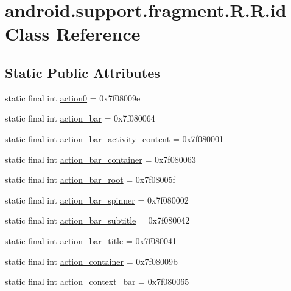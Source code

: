 \hypertarget{classandroid_1_1support_1_1fragment_1_1_r_1_1id}{
\section{android.support.fragment.R.R.id Class Reference}
\label{classandroid_1_1support_1_1fragment_1_1_r_1_1id}
}
\subsection*{Static Public Attributes}
\begin{CompactItemize}
\item 
static final int \hyperlink{classandroid_1_1support_1_1fragment_1_1_r_1_1id_8768c2d6a2ef0f8ac9ca56da079d671c}{action0} = 0x7f08009e
\item 
static final int \hyperlink{classandroid_1_1support_1_1fragment_1_1_r_1_1id_61432839d3f52709b27cc385cb9106c8}{action\_\-bar} = 0x7f080064
\item 
static final int \hyperlink{classandroid_1_1support_1_1fragment_1_1_r_1_1id_4ea46daf28d27d5b859f591bd828e99b}{action\_\-bar\_\-activity\_\-content} = 0x7f080001
\item 
static final int \hyperlink{classandroid_1_1support_1_1fragment_1_1_r_1_1id_62adbb06bac6d68aa8f39b92b2103309}{action\_\-bar\_\-container} = 0x7f080063
\item 
static final int \hyperlink{classandroid_1_1support_1_1fragment_1_1_r_1_1id_cf4c6df53adaebeeb60e8385a8cbfd77}{action\_\-bar\_\-root} = 0x7f08005f
\item 
static final int \hyperlink{classandroid_1_1support_1_1fragment_1_1_r_1_1id_a46d8f268ebc80739b4594be07a2e886}{action\_\-bar\_\-spinner} = 0x7f080002
\item 
static final int \hyperlink{classandroid_1_1support_1_1fragment_1_1_r_1_1id_ca9bd6b2ce696a1d0d55f945785fe560}{action\_\-bar\_\-subtitle} = 0x7f080042
\item 
static final int \hyperlink{classandroid_1_1support_1_1fragment_1_1_r_1_1id_79bfcd6ccb650d1ebb39b4656a8302f4}{action\_\-bar\_\-title} = 0x7f080041
\item 
static final int \hyperlink{classandroid_1_1support_1_1fragment_1_1_r_1_1id_c8bb20edbdbcc4a44f6692a346d64690}{action\_\-container} = 0x7f08009b
\item 
static final int \hyperlink{classandroid_1_1support_1_1fragment_1_1_r_1_1id_fa0855e6db771f849b436f407109067e}{action\_\-context\_\-bar} = 0x7f080065

\end{CompactItemize}
